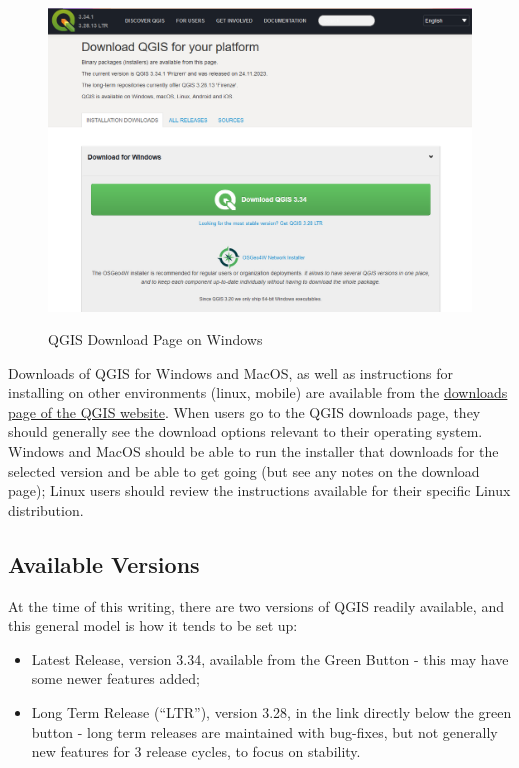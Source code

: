 \documentclass[
  letterpaper,
  DIV=11,
  numbers=noendperiod]{scrreprt}
\providecommand{\tightlist}{%
  \setlength{\itemsep}{0pt}\setlength{\parskip}{0pt}}\usepackage{longtable,booktabs,array}
\begin{document}
\begin{figure}

{\centering 

\href{https://www.qgis.org/en/site/forusers/download.html}{\includegraphics{./images/download_page.png}}

}

\caption{QGIS Download Page on Windows}

\end{figure}

Downloads of QGIS for Windows and MacOS, as well as instructions for
installing on other environments (linux, mobile) are available from the
\href{https://qgis.org/en/site/forusers/download.html}{downloads page of
the QGIS website}. When users go to the QGIS downloads page, they should
generally see the download options relevant to their operating system.
Windows and MacOS should be able to run the installer that downloads for
the selected version and be able to get going (but see any notes on the
download page); Linux users should review the instructions available for
their specific Linux distribution.

\hypertarget{available-versions}{%
\subsection{Available Versions}\label{available-versions}}

At the time of this writing, there are two versions of QGIS readily
available, and this general model is how it tends to be set up:

\begin{itemize}
\tightlist
\item
  Latest Release, version 3.34, available from the Green Button - this
  may have some newer features added;
\item
  Long Term Release (``LTR''), version 3.28, in the link directly below
  the green button - long term releases are maintained with bug-fixes,
  but not generally new features for 3 release cycles, to focus on
  stability.
\end{itemize}
\end{document}
